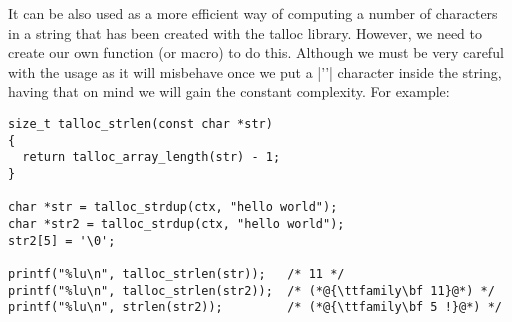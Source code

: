 \noindent
It can be also used as a more efficient way of computing a number of characters
in a string that has been created with the talloc library. However, we need to
create our own function (or macro) to do this. Although we must be very careful
with the usage as it will misbehave once we put a |'\0'| character inside the
string, having that on mind we will gain the constant complexity. For example:

\begin{lstlisting}[caption={Length of a string},label=lst:array-length]
size_t talloc_strlen(const char *str)
{
  return talloc_array_length(str) - 1;
}

char *str = talloc_strdup(ctx, "hello world");
char *str2 = talloc_strdup(ctx, "hello world");
str2[5] = '\0';

printf("%lu\n", talloc_strlen(str));   /* 11 */
printf("%lu\n", talloc_strlen(str2));  /* (*@{\ttfamily\bf 11}@*) */
printf("%lu\n", strlen(str2));         /* (*@{\ttfamily\bf 5 !}@*) */
\end{lstlisting}

